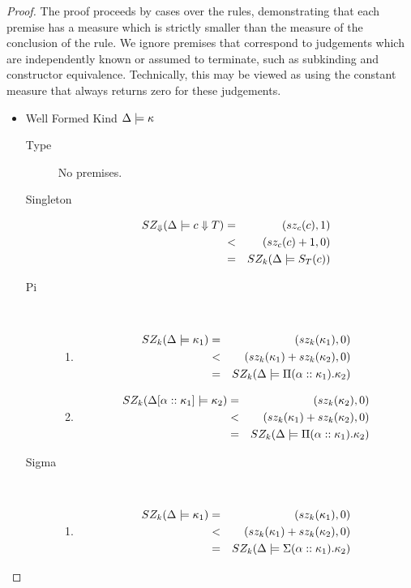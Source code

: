 \documentclass[12pt,twoside,fleqn]{amsart}
\theoremstyle{plain}
\theoremstyle{plain}
\theoremstyle{definition}
\begin{document}
\begin{proof}
The proof proceeds by cases over the rules, demonstrating that each premise
has a measure which is strictly smaller than the measure of the conclusion of
the rule. We ignore premises that correspond to judgements which are independently
known or assumed to terminate, such as subkinding and constructor equivalence.
Technically, this may be viewed as using the constant measure that always returns
zero for these judgements. 
\begin{itemize}
\item Well Formed Kind \( \Delta  \models \kappa  \)

\begin{description}
\item [Type]No premises.
\item [Singleton]
\begin{eqnarray*}
SZ_{\Downarrow }(\Delta   \models c  \Downarrow T  ) & = & (sz_{c}(c ),1)\\
 & < & (sz_{c}(c )+1,0)\\
 & = & SZ_k(\Delta   \models S_{T}(c ) )
\end{eqnarray*}

\item [Pi]~

\begin{enumerate}
\item 
\begin{eqnarray*}
SZ_k(\Delta   \models \kappa _{1} ) & = & (sz_k(\kappa _{1}),0)\\
 & < & (sz_k(\kappa _{1})+sz_k(\kappa _{2}),0)\\
 & = & SZ_k(\Delta   \models \Pi (\alpha ::\kappa _{1}).\kappa _{2} )
\end{eqnarray*}

\item 
\begin{eqnarray*}
SZ_k(\Delta  [\alpha   ::\kappa _{1}  ]  \models \kappa _{2} ) & = & (sz_k(\kappa _{2}),0)\\
 & < & (sz_k(\kappa _{1})+sz_k(\kappa _{2}),0)\\
 & = & SZ_k(\Delta   \models \Pi (\alpha ::\kappa _{1}).\kappa _{2} )
\end{eqnarray*}

\end{enumerate}
\item [Sigma]~

\begin{enumerate}
\item 
\begin{eqnarray*}
SZ_k(\Delta   \models \kappa _{1} ) & = & (sz_k(\kappa _{1}),0)\\
 & < & (sz_k(\kappa _{1})+sz_k(\kappa _{2}),0)\\
 & = & SZ_k(\Delta   \models \Sigma (\alpha ::\kappa _{1}).\kappa _{2} )
\end{eqnarray*}


\end{enumerate}
\end{description}
\end{itemize}
\end{proof}
\end{document}

